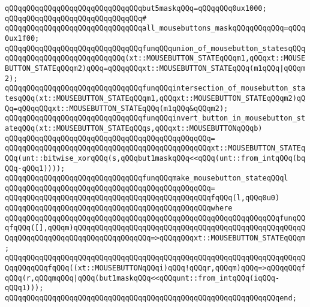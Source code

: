 \verb|qQQqqQQqqQQqqQQqqQQqqQQqqQQqqQQqbut5maskqQQq=qQQqqQQq0ux1000;|\newline
\verb|qQQqqQQqqQQqqQQqqQQqqQQqqQQqqQQq#|\newline
\verb|qQQqqQQqqQQqqQQqqQQqqQQqqQQqqQQqall_mousebuttons_maskqQQqqQQqqQQq=qQQq0ux1f00;|\newline
\newline
\verb|qQQqqQQqqQQqqQQqqQQqqQQqqQQqqQQqfunqQQqunion_of_mousebutton_statesqQQqqQQqqQQqqQQqqQQqqQQqqQQqqQQq(xt::MOUSEBUTTON_STATEqQQqm1,qQQqxt::MOUSEBUTTON_STATEqQQqm2)qQQq=qQQqqQQqxt::MOUSEBUTTON_STATEqQQq(m1qQQq|\verb#|qQQqm2);#\newline
\verb|qQQqqQQqqQQqqQQqqQQqqQQqqQQqqQQqfunqQQqintersection_of_mousebutton_statesqQQq(xt::MOUSEBUTTON_STATEqQQqm1,qQQqxt::MOUSEBUTTON_STATEqQQqm2)qQQq=qQQqqQQqxt::MOUSEBUTTON_STATEqQQq(m1qQQq&qQQqm2);|\newline
\newline
\verb|qQQqqQQqqQQqqQQqqQQqqQQqqQQqqQQqfunqQQqinvert_button_in_mousebutton_stateqQQq(xt::MOUSEBUTTON_STATEqQQqs,qQQqxt::MOUSEBUTTONqQQqb)|\newline
\verb|qQQqqQQqqQQqqQQqqQQqqQQqqQQqqQQqqQQqqQQqqQQqqQQq=|\newline
\verb|qQQqqQQqqQQqqQQqqQQqqQQqqQQqqQQqqQQqqQQqqQQqqQQqxt::MOUSEBUTTON_STATEqQQq(unt::bitwise_xorqQQq(s,qQQqbut1maskqQQq<<qQQq(unt::from_intqQQq(bqQQq-qQQq1))));|\newline
\newline
\verb|qQQqqQQqqQQqqQQqqQQqqQQqqQQqqQQqfunqQQqmake_mousebutton_stateqQQql|\newline
\verb|qQQqqQQqqQQqqQQqqQQqqQQqqQQqqQQqqQQqqQQqqQQqqQQq=|\newline
\verb|qQQqqQQqqQQqqQQqqQQqqQQqqQQqqQQqqQQqqQQqqQQqqQQqfqQQq(l,qQQq0u0)|\newline
\verb|qQQqqQQqqQQqqQQqqQQqqQQqqQQqqQQqqQQqqQQqqQQqqQQqwhere|\newline
\verb|qQQqqQQqqQQqqQQqqQQqqQQqqQQqqQQqqQQqqQQqqQQqqQQqqQQqqQQqqQQqqQQqfunqQQqfqQQq([],qQQqm)qQQqqQQqqQQqqQQqqQQqqQQqqQQqqQQqqQQqqQQqqQQqqQQqqQQqqQQqqQQqqQQqqQQqqQQqqQQqqQQqqQQqqQQq=>qQQqqQQqxt::MOUSEBUTTON_STATEqQQqm;|\newline
\verb|qQQqqQQqqQQqqQQqqQQqqQQqqQQqqQQqqQQqqQQqqQQqqQQqqQQqqQQqqQQqqQQqqQQqqQQqqQQqqQQqfqQQq((xt::MOUSEBUTTONqQQqi)qQQq!qQQqr,qQQqm)qQQq=>qQQqqQQqfqQQq(r,qQQqmqQQq|\verb#|qQQq(but1maskqQQq<<qQQqunt::from_intqQQq(iqQQq-qQQq1)));#\newline
\verb|qQQqqQQqqQQqqQQqqQQqqQQqqQQqqQQqqQQqqQQqqQQqqQQqqQQqqQQqqQQqqQQqend;|\newline
